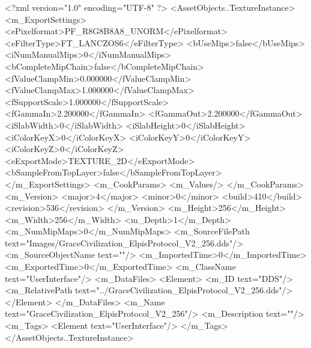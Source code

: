 <?xml version="1.0" encoding="UTF-8" ?>
<AssetObjects..TextureInstance>
	<m_ExportSettings>
		<ePixelformat>PF_R8G8B8A8_UNORM</ePixelformat>
		<eFilterType>FT_LANCZOS6</eFilterType>
		<bUseMips>false</bUseMips>
		<iNumManualMips>0</iNumManualMips>
		<bCompleteMipChain>false</bCompleteMipChain>
		<fValueClampMin>0.000000</fValueClampMin>
		<fValueClampMax>1.000000</fValueClampMax>
		<fSupportScale>1.000000</fSupportScale>
		<fGammaIn>2.200000</fGammaIn>
		<fGammaOut>2.200000</fGammaOut>
		<iSlabWidth>0</iSlabWidth>
		<iSlabHeight>0</iSlabHeight>
		<iColorKeyX>0</iColorKeyX>
		<iColorKeyY>0</iColorKeyY>
		<iColorKeyZ>0</iColorKeyZ>
		<eExportMode>TEXTURE_2D</eExportMode>
		<bSampleFromTopLayer>false</bSampleFromTopLayer>
	</m_ExportSettings>
	<m_CookParams>
		<m_Values/>
	</m_CookParams>
	<m_Version>
		<major>4</major>
		<minor>0</minor>
		<build>410</build>
		<revision>536</revision>
	</m_Version>
	<m_Height>256</m_Height>
	<m_Width>256</m_Width>
	<m_Depth>1</m_Depth>
	<m_NumMipMaps>0</m_NumMipMaps>
	<m_SourceFilePath text="Images/GraceCivilization_ElpisProtocol_V2_256.dds"/>
	<m_SourceObjectName text=""/>
	<m_ImportedTime>0</m_ImportedTime>
	<m_ExportedTime>0</m_ExportedTime>
	<m_ClassName text="UserInterface"/>
	<m_DataFiles>
		<Element>
			<m_ID text="DDS"/>
			<m_RelativePath text="../GraceCivilization_ElpisProtocol_V2_256.dds"/>
		</Element>
	</m_DataFiles>
	<m_Name text="GraceCivilization_ElpisProtocol_V2_256"/>
	<m_Description text=""/>
	<m_Tags>
		<Element text="UserInterface"/>
	</m_Tags>
</AssetObjects..TextureInstance>
